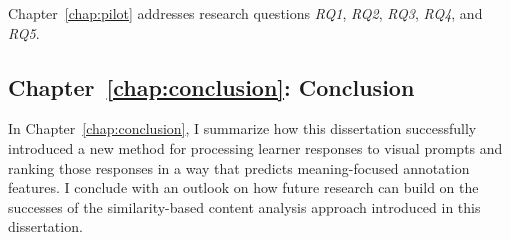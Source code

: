Chapter~\ref{chap:pilot} addresses research questions \textit{RQ1}, \textit{RQ2}, \textit{RQ3}, \textit{RQ4}, and \textit{RQ5}.


\subsection{Chapter~\ref{chap:conclusion}: Conclusion}
In Chapter~\ref{chap:conclusion}, I summarize how this dissertation successfully introduced a new method for processing learner responses to visual prompts and ranking those responses in a way that predicts meaning-focused annotation features.
I conclude with an outlook on how future research can build on the successes of the similarity-based content analysis approach introduced in this dissertation.


